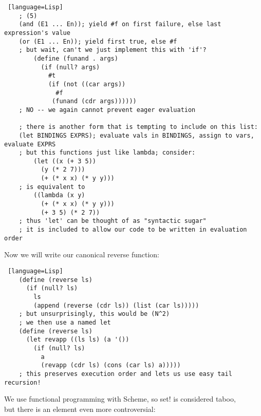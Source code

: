 \documentclass[../../lecture_notes.tex]{subfiles}
\begin{document}
\begin{lstlisting} [language=Lisp]
	; (5)
	(and (E1 ... En)); yield #f on first failure, else last expression's value
	(or (E1 ... En)); yield first true, else #f
	; but wait, can't we just implement this with 'if'?
		(define (funand . args)
		  (if (null? args)
		    #t
		    (if (not ((car args))
		      #f
		     (funand (cdr args))))))
	; NO -- we again cannot prevent eager evaluation
 
	; there is another form that is tempting to include on this list:
	(let BINDINGS EXPRS); evaluate vals in BINDINGS, assign to vars, evaluate EXPRS
	; but this functions just like lambda; consider:
		(let ((x (+ 3 5))
		  (y (* 2 7)))
		  (+ (* x x) (* y y)))
	; is equivalent to
		((lambda (x y)
		  (+ (* x x) (* y y)))
		  (+ 3 5) (* 2 7))
	; thus 'let' can be thought of as "syntactic sugar"
	; it is included to allow our code to be written in evaluation order
\end{lstlisting}

\noindent Now we will write our canonical reverse function:
\begin{lstlisting} [language=Lisp]
	(define (reverse ls)
	  (if (null? ls)
	    ls
	    (append (reverse (cdr ls)) (list (car ls)))))
	; but unsurprisingly, this would be (N^2)
	; we then use a named let
	(define (reverse ls)
	  (let revapp ((ls ls) (a '())
	    (if (null? ls)
 	      a
	      (revapp (cdr ls) (cons (car ls) a)))))
	; this preserves execution order and lets us use easy tail recursion!
\end{lstlisting}
\noindent We use functional programming with Scheme, so set! is considered taboo, \\
\indent but there is an element even more controversial:
\end{document}
